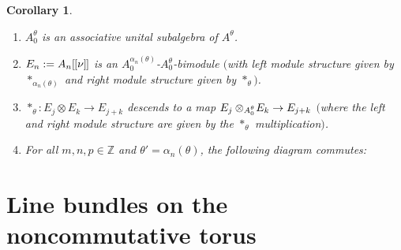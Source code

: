 \documentclass[pdftex]{sigma}
\numberwithin{equation}{section}
\newtheorem{cor}[thm]{Corollary}
\theoremstyle{definition}
\newcommand{\Z}{\mathbb{Z}}
\newcommand{\id}{\mathsf{id}}
\newcommand{\lbrak}{[\hspace{-0.5pt}[}
\newcommand{\rbrak}{]\hspace{-0.5pt}]}
\renewcommand{\hbar}{\nu}
\begin{document}
\begin{cor}\label{cor:3.3} \quad
\begin{enumerate}\itemsep=0pt
\item[$1)$]
$A_0^{\theta}$ is an associative unital subalgebra of $A^{\theta}$.

\item[$2)$]
$E_n:=A_n\lbrak\hbar\rbrak$ is an $A_0^{\alpha_n(\theta)}$-$A_0^{\theta}$-bimodule $($with left module structure given by $\ast_{\alpha_n(\theta)}$ and right module structure given by $\ast_\theta)$.

\item[$3)$]
$ \ast_\theta\colon E_j\otimes E_k\to E_{j+k}$ descends to a map
$E_j\otimes_{\smash[t]{A_0^{\theta}}}\! E_k\to E_{j+k}$ $($where the left and right module structure are given by the $\ast_\theta$ multiplication$)$.

\item[$4)$]
For all $m,n,p\in\Z$ and
$\theta'=\alpha_n(\theta)$, the following diagram commutes:
\begin{center}
\end{center}
\end{enumerate}
\end{cor}

\section{Line bundles on the noncommutative torus}\label{sec:4}
\end{document}
